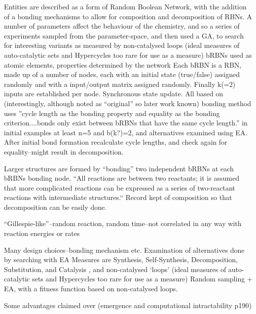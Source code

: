 Entities are described as a form of Random Boolean Network, with the addition of a bonding mechanisms to allow for composition and decomposition of RBNs. A number of parameters affect the behaviour of the chemistry, and so a series of experiments sampled from the parameter-space, and then used a GA, to search for interesting variants as measured by non-catalysed loops (ideal measures of auto-catalytic sets and Hypercycles too rare for use as a measure) \parencite[chap.8]{Faulconbridge2011}
bRBNs used as atomic elements, properties determined by the network
Each bRBN is a RBN, made up of a number of nodes, each with an initial state (true/false) assigned randomly and with a input/output matrix assigned randomly. Finally k(=2) inputs are established per node. Synchronous state update. All based on \cite{Kauffman:1969ne} (interestingly, although noted as ``original'' so later work known) bonding method uses ''cycle length as the bonding property and equality as the bonding criterion....bonds only exist between bRBNs that have the same cycle length.'' in initial examples at least n=5 and b(k?)=2, and alternatives examined using EA. After initial bond formation recalculate cycle lengths, and check again for equality--might result in decomposition.

Larger structures are formed by ``bonding'' two independent bRBNs at each bRBNs bonding node. ``All reactions are between two reactants; it is assumed that more complicated reactions can be expressed as a series of two-reactant reactions with intermediate structures.`` Record kept of composition so that decomposition can be easily done.

``Gillespie-like''--random reaction, random time--not correlated in any way with reaction energies or rates \parencite[chap.8]{Faulconbridge2011}

Many design choices--bonding mechanism etc. Examination of alternatives done by searching with EA
Measures are Synthesis, Self-Synthesis, Decomposition, Substitution, and Catalysis \parencite[chap.7]{Faulconbridge2011}, and non-catalysed `loops' (ideal measures of auto-catalytic sets and Hypercycles too rare for use as a measure) \parencite[chap.8]{Faulconbridge2011}
Random sampling + EA, with a fitness function based on non-catalysed loops.

Some advantages claimed over \cite{Hutton2007} (emergence and computational intractability p190)

